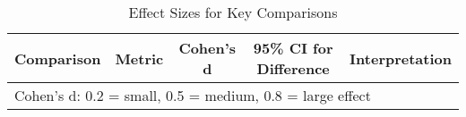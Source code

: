 \begin{table*}[htbp]
\centering
\caption{Effect Sizes for Key Comparisons}
\label{tab:effect-sizes}
\begin{tabular}{llccl}
\toprule
Comparison & Metric & Cohen's d & 95\% CI for Difference & Interpretation \\
\midrule
\bottomrule
\multicolumn{5}{l}{\small Cohen's d: 0.2 = small, 0.5 = medium, 0.8 = large effect} \\
\end{tabular}
\end{table*}
